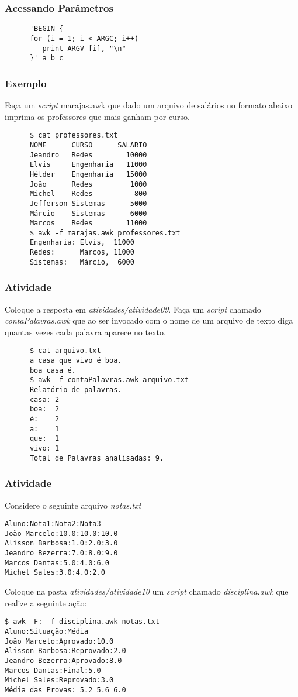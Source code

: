 \documentclass{beamer}
\begin{document}
   \begin{frame}[fragile]
      \frametitle{Acessando Parâmetros}
      \begin{verbatim}
      'BEGIN {
      for (i = 1; i < ARGC; i++)
         print ARGV [i], "\n"
      }' a b c
      \end{verbatim}
\end{frame}

\begin{frame}[fragile]
      \frametitle{Exemplo}
      Faça um \textit{script} marajas.awk que dado um arquivo de salários no formato abaixo imprima os professores que mais ganham por curso.
      \begin{verbatim}
      $ cat professores.txt
      NOME      CURSO      SALARIO
      Jeandro   Redes        10000
      Elvis     Engenharia   11000
      Hélder    Engenharia   15000
      João      Redes         1000
      Michel    Redes          800
      Jefferson Sistemas      5000
      Márcio    Sistemas      6000
      Marcos    Redes        11000
      $ awk -f marajas.awk professores.txt
      Engenharia: Elvis,  11000
      Redes:      Marcos, 11000
      Sistemas:   Márcio,  6000
      \end{verbatim}
\end{frame}

   \begin{frame}[fragile]
      \frametitle{Atividade}
      Coloque a resposta em \textit{atividades/atividade09}. Faça um \textit{script} chamado \textit{contaPalavras.awk} que ao ser invocado com o nome de um arquivo de texto diga quantas vezes cada palavra aparece no texto. \\
      \begin{verbatim}
      $ cat arquivo.txt
      a casa que vivo é boa.
      boa casa é.
      $ awk -f contaPalavras.awk arquivo.txt 
      Relatório de palavras.
      casa: 2
      boa:  2
      é:    2
      a:    1
      que:  1
      vivo: 1
      Total de Palavras analisadas: 9.
      \end{verbatim}
\end{frame}

   \begin{frame}[fragile]
      \frametitle{Atividade}
      Considere o seguinte arquivo \textit{notas.txt}
      \begin{verbatim}
Aluno:Nota1:Nota2:Nota3 
João Marcelo:10.0:10.0:10.0 
Alisson Barbosa:1.0:2.0:3.0
Jeandro Bezerra:7.0:8.0:9.0
Marcos Dantas:5.0:4.0:6.0
Michel Sales:3.0:4.0:2.0 
      \end{verbatim}
      Coloque na pasta \textit{atividades/atividade10} um \textit{script} chamado \textit{disciplina.awk} que realize a seguinte ação:
      \begin{verbatim}
$ awk -F: -f disciplina.awk notas.txt
Aluno:Situação:Média
João Marcelo:Aprovado:10.0
Alisson Barbosa:Reprovado:2.0
Jeandro Bezerra:Aprovado:8.0
Marcos Dantas:Final:5.0
Michel Sales:Reprovado:3.0
Média das Provas: 5.2 5.6 6.0
      \end{verbatim}
\end{frame}
\end{document}
